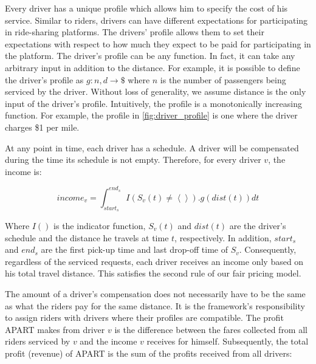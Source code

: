 Every driver has a unique profile which allows him to specify the cost of his service. Similar to riders, drivers can have different expectations for participating in ride-sharing platforms. The drivers' profile allows them to set their expectations with respect to how much they expect to be paid for participating in the platform. The driver's profile can be any function. In fact, it can take any arbitrary input in addition to the distance. For example, it is possible to define the driver's profile as $g: n, d \rightarrow \$$ where $n$ is the number of passengers being serviced by the driver. Without loss of generality, we assume distance is the only input of the driver's profile. Intuitively, the profile is a monotonically increasing function. For example, the profile in \cref{fig:driver_profile} is one where the driver charges \$1 per mile.

At any point in time, each driver has a schedule. A driver will be compensated during the time its schedule is not empty. Therefore, for every driver $v$, the income is:

\begin{equation}
\label{eq:payment}
income_v = \int_{start_s}^{end_s} I\left( S_v(t) \neq \left\langle \right\rangle\right).g(dist(t))dt
\end{equation}

\noindent Where $I()$ is the indicator function, $S_v(t)$ and $dist(t)$ are the driver's schedule and the distance he travels at time $t$, respectively. In addition, $start_s$ and $end_s$ are the first pick-up time and last drop-off time of $S_v$. Consequently, regardless of the serviced requests, each driver receives an income only based on his total travel distance. This satisfies the second rule of our fair pricing model.

The amount of a driver's compensation does not necessarily have to be the same as what the riders pay for the same distance. It is the framework's responsibility to assign riders with drivers where their profiles are compatible. The profit APART makes from driver $v$ is the difference between the fares collected from all riders serviced by $v$ and the income $v$ receives for himself. Subsequently, the total profit (revenue) of APART is the sum of the profits received from all drivers:

